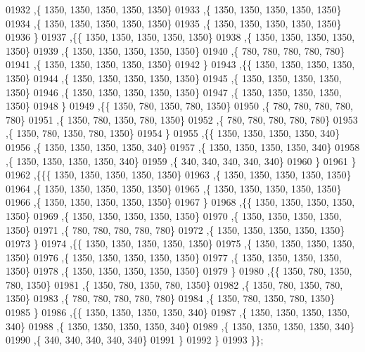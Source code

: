 \begin{DoxyCode}
01932    ,\{  1350,  1350,  1350,  1350,  1350\}
01933    ,\{  1350,  1350,  1350,  1350,  1350\}
01934    ,\{  1350,  1350,  1350,  1350,  1350\}
01935    ,\{  1350,  1350,  1350,  1350,  1350\}
01936    \}
01937   ,\{\{  1350,  1350,  1350,  1350,  1350\}
01938    ,\{  1350,  1350,  1350,  1350,  1350\}
01939    ,\{  1350,  1350,  1350,  1350,  1350\}
01940    ,\{   780,   780,   780,   780,   780\}
01941    ,\{  1350,  1350,  1350,  1350,  1350\}
01942    \}
01943   ,\{\{  1350,  1350,  1350,  1350,  1350\}
01944    ,\{  1350,  1350,  1350,  1350,  1350\}
01945    ,\{  1350,  1350,  1350,  1350,  1350\}
01946    ,\{  1350,  1350,  1350,  1350,  1350\}
01947    ,\{  1350,  1350,  1350,  1350,  1350\}
01948    \}
01949   ,\{\{  1350,   780,  1350,   780,  1350\}
01950    ,\{   780,   780,   780,   780,   780\}
01951    ,\{  1350,   780,  1350,   780,  1350\}
01952    ,\{   780,   780,   780,   780,   780\}
01953    ,\{  1350,   780,  1350,   780,  1350\}
01954    \}
01955   ,\{\{  1350,  1350,  1350,  1350,   340\}
01956    ,\{  1350,  1350,  1350,  1350,   340\}
01957    ,\{  1350,  1350,  1350,  1350,   340\}
01958    ,\{  1350,  1350,  1350,  1350,   340\}
01959    ,\{   340,   340,   340,   340,   340\}
01960    \}
01961   \}
01962  ,\{\{\{  1350,  1350,  1350,  1350,  1350\}
01963    ,\{  1350,  1350,  1350,  1350,  1350\}
01964    ,\{  1350,  1350,  1350,  1350,  1350\}
01965    ,\{  1350,  1350,  1350,  1350,  1350\}
01966    ,\{  1350,  1350,  1350,  1350,  1350\}
01967    \}
01968   ,\{\{  1350,  1350,  1350,  1350,  1350\}
01969    ,\{  1350,  1350,  1350,  1350,  1350\}
01970    ,\{  1350,  1350,  1350,  1350,  1350\}
01971    ,\{   780,   780,   780,   780,   780\}
01972    ,\{  1350,  1350,  1350,  1350,  1350\}
01973    \}
01974   ,\{\{  1350,  1350,  1350,  1350,  1350\}
01975    ,\{  1350,  1350,  1350,  1350,  1350\}
01976    ,\{  1350,  1350,  1350,  1350,  1350\}
01977    ,\{  1350,  1350,  1350,  1350,  1350\}
01978    ,\{  1350,  1350,  1350,  1350,  1350\}
01979    \}
01980   ,\{\{  1350,   780,  1350,   780,  1350\}
01981    ,\{  1350,   780,  1350,   780,  1350\}
01982    ,\{  1350,   780,  1350,   780,  1350\}
01983    ,\{   780,   780,   780,   780,   780\}
01984    ,\{  1350,   780,  1350,   780,  1350\}
01985    \}
01986   ,\{\{  1350,  1350,  1350,  1350,   340\}
01987    ,\{  1350,  1350,  1350,  1350,   340\}
01988    ,\{  1350,  1350,  1350,  1350,   340\}
01989    ,\{  1350,  1350,  1350,  1350,   340\}
01990    ,\{   340,   340,   340,   340,   340\}
01991    \}
01992   \}
01993  \}\};
\end{DoxyCode}
